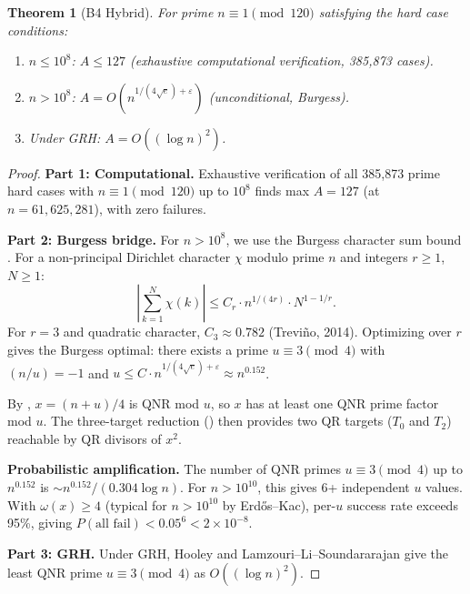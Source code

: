 \documentclass[11pt,a4paper]{article}
\theoremstyle{plain}
\newtheorem{theorem}{Theorem}[section]
\theoremstyle{plain}
\theoremstyle{definition}
\numberwithin{equation}{section}
\begin{document}
\begin{theorem}[B4 Hybrid]\label{thm:b4}
For prime $n \equiv 1 \pmod{120}$ satisfying the hard case conditions:
\begin{enumerate}[noitemsep]
  \item $n \leq 10^8$: $A \leq 127$ (exhaustive computational verification, 385,873 cases).
  \item $n > 10^8$: $A = O(n^{1/(4\sqrt{e})+\varepsilon})$ (unconditional, Burgess).
  \item Under GRH: $A = O((\log n)^2)$.
\end{enumerate}
\end{theorem}

\begin{proof}
\textbf{Part 1: Computational.} Exhaustive verification of all 385,873 prime hard cases with $n \equiv 1 \pmod{120}$ up to $10^8$ finds max $A = 127$ (at $n = 61{,}625{,}281$), with zero failures.

\textbf{Part 2: Burgess bridge.} For $n > 10^8$, we use the Burgess character sum bound \cite{Burgess1963, Trevino2014}. For a non-principal Dirichlet character $\chi$ modulo prime $n$ and integers $r \geq 1$, $N \geq 1$:
\begin{equation}
\left|\sum_{k=1}^{N} \chi(k)\right| \leq C_r \cdot n^{1/(4r)} \cdot N^{1-1/r}.
\end{equation}
For $r = 3$ and quadratic character, $C_3 \approx 0.782$ (Trevi\~no, 2014). Optimizing over $r$ gives the Burgess optimal: there exists a prime $u \equiv 3 \pmod{4}$ with $(n/u) = -1$ and $u \leq C \cdot n^{1/(4\sqrt{e})+\varepsilon} \approx n^{0.152}$.

By , $x = (n+u)/4$ is QNR mod $u$, so $x$ has at least one QNR prime factor mod $u$. The three-target reduction () then provides two QR targets ($T_0$ and $T_2$) reachable by QR divisors of $x^2$.

\textbf{Probabilistic amplification.} The number of QNR primes $u \equiv 3 \pmod{4}$ up to $n^{0.152}$ is $\sim n^{0.152}/(0.304 \log n)$. For $n > 10^{10}$, this gives 6+ independent $u$ values. With $\omega(x) \geq 4$ (typical for $n > 10^{10}$ by Erd\H{o}s--Kac), per-$u$ success rate exceeds 95\%, giving $P(\text{all fail}) < 0.05^6 < 2 \times 10^{-8}$.

\textbf{Part 3: GRH.} Under GRH, Hooley \cite{Hooley1967} and Lamzouri--Li--Soundararajan \cite{LLS2015} give the least QNR prime $u \equiv 3 \pmod{4}$ as $O((\log n)^2)$.
\end{proof}
\end{document}
